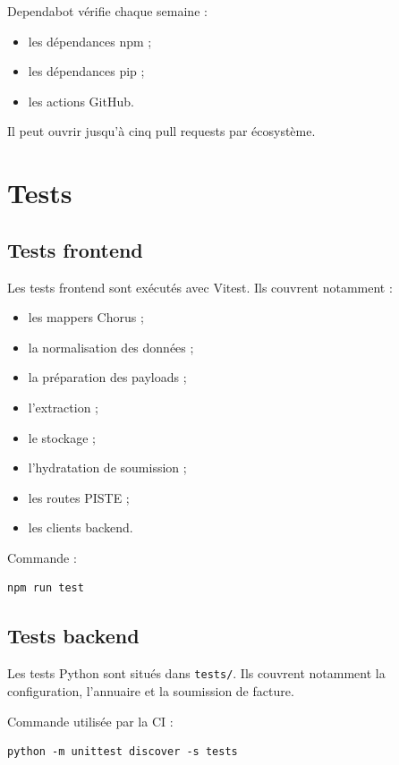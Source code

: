 \documentclass[11pt,a4paper]{article}
\begin{document}
Dependabot vérifie chaque semaine :

\begin{itemize}
  \item les dépendances npm ;
  \item les dépendances pip ;
  \item les actions GitHub.
\end{itemize}

Il peut ouvrir jusqu'à cinq pull requests par écosystème.

\section{Tests}

\subsection{Tests frontend}

Les tests frontend sont exécutés avec Vitest. Ils couvrent notamment :

\begin{itemize}
  \item les mappers Chorus ;
  \item la normalisation des données ;
  \item la préparation des payloads ;
  \item l'extraction ;
  \item le stockage ;
  \item l'hydratation de soumission ;
  \item les routes PISTE ;
  \item les clients backend.
\end{itemize}

Commande :

\begin{lstlisting}
npm run test
\end{lstlisting}

\subsection{Tests backend}

Les tests Python sont situés dans \texttt{tests/}. Ils couvrent notamment la
configuration, l'annuaire et la soumission de facture.

Commande utilisée par la CI :

\begin{lstlisting}
python -m unittest discover -s tests
\end{lstlisting}
\end{document}
